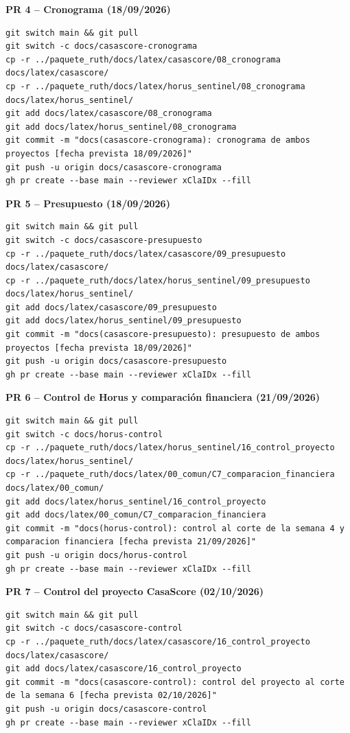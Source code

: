 \documentclass[11pt,a4paper]{article}
\begin{document}
\noindent\textbf{PR 4 -- Cronograma (18/09/2026)}
\begin{lstlisting}
git switch main && git pull
git switch -c docs/casascore-cronograma
cp -r ../paquete_ruth/docs/latex/casascore/08_cronograma docs/latex/casascore/
cp -r ../paquete_ruth/docs/latex/horus_sentinel/08_cronograma docs/latex/horus_sentinel/
git add docs/latex/casascore/08_cronograma
git add docs/latex/horus_sentinel/08_cronograma
git commit -m "docs(casascore-cronograma): cronograma de ambos proyectos [fecha prevista 18/09/2026]"
git push -u origin docs/casascore-cronograma
gh pr create --base main --reviewer xClaIDx --fill
\end{lstlisting}

\noindent\textbf{PR 5 -- Presupuesto (18/09/2026)}
\begin{lstlisting}
git switch main && git pull
git switch -c docs/casascore-presupuesto
cp -r ../paquete_ruth/docs/latex/casascore/09_presupuesto docs/latex/casascore/
cp -r ../paquete_ruth/docs/latex/horus_sentinel/09_presupuesto docs/latex/horus_sentinel/
git add docs/latex/casascore/09_presupuesto
git add docs/latex/horus_sentinel/09_presupuesto
git commit -m "docs(casascore-presupuesto): presupuesto de ambos proyectos [fecha prevista 18/09/2026]"
git push -u origin docs/casascore-presupuesto
gh pr create --base main --reviewer xClaIDx --fill
\end{lstlisting}

\noindent\textbf{PR 6 -- Control de Horus y comparación financiera (21/09/2026)}
\begin{lstlisting}
git switch main && git pull
git switch -c docs/horus-control
cp -r ../paquete_ruth/docs/latex/horus_sentinel/16_control_proyecto docs/latex/horus_sentinel/
cp -r ../paquete_ruth/docs/latex/00_comun/C7_comparacion_financiera docs/latex/00_comun/
git add docs/latex/horus_sentinel/16_control_proyecto
git add docs/latex/00_comun/C7_comparacion_financiera
git commit -m "docs(horus-control): control al corte de la semana 4 y comparacion financiera [fecha prevista 21/09/2026]"
git push -u origin docs/horus-control
gh pr create --base main --reviewer xClaIDx --fill
\end{lstlisting}

\noindent\textbf{PR 7 -- Control del proyecto CasaScore (02/10/2026)}
\begin{lstlisting}
git switch main && git pull
git switch -c docs/casascore-control
cp -r ../paquete_ruth/docs/latex/casascore/16_control_proyecto docs/latex/casascore/
git add docs/latex/casascore/16_control_proyecto
git commit -m "docs(casascore-control): control del proyecto al corte de la semana 6 [fecha prevista 02/10/2026]"
git push -u origin docs/casascore-control
gh pr create --base main --reviewer xClaIDx --fill
\end{lstlisting}
\end{document}
